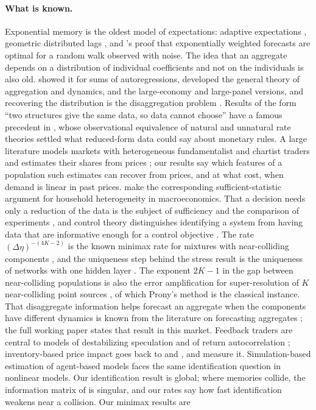 \documentclass[12pt]{article}
\theoremstyle{definition}
\theoremstyle{remark}
\begin{document}
\paragraph{What is known.} Exponential memory is the oldest model of expectations: adaptive expectations \citep{cagan1956,nerlove1958}, geometric distributed lags \citep{koyck1954}, and \citet{muth1960}'s proof that exponentially weighted forecasts are optimal for a random walk observed with noise. The idea that an aggregate depends on a distribution of individual coefficients and not on the individuals is also old. \citet{granger1980} showed it for sums of autoregressions, \citet{forni1997} developed the general theory of aggregation and dynamics, \citet{zaffaroni2004} and \citet{pesaran2014} the large-economy and large-panel versions, and recovering the distribution is the disaggregation problem \citep{celov2008}. Results of the form ``two structures give the same data, so data cannot choose'' have a famous precedent in \citet{sargent1976}, whose observational equivalence of natural and unnatural rate theories settled what reduced-form data could say about monetary rules. A large literature models markets with heterogeneous fundamentalist and chartist traders \citep{brock1998,hommes2006} and estimates their shares from prices \citep{boswijk2007,franke2012,lux2018}; our results say which features of a population such estimates can recover from prices, and at what cost, when demand is linear in past prices. \citet{auclert2024} make the corresponding sufficient-statistic argument for household heterogeneity in macroeconomics. That a decision needs only a reduction of the data is the subject of sufficiency and the comparison of experiments \citep{blackwell1953,lecam1964}, and control theory distinguishes identifying a system from having data that are informative enough for a control objective \citep{vanwaarde2020}. The rate $(\Delta\eta)^{-(4K-2)}$ is the known minimax rate for mixtures with near-colliding components \citep{heinrich2018,wu2020}, and the uniqueness step behind the stress result is the uniqueness of networks with one hidden layer \citep{sussmann1992}. The exponent $2K-1$ in the gap between near-colliding populations is also the error amplification for super-resolution of $K$ near-colliding point sources \citep{batenkov2021}, of which Prony's method is the classical instance. That disaggregate information helps forecast an aggregate when the components have different dynamics is known from the literature on forecasting aggregates \citep{lutkepohl1987,hendry2011}; the full working paper \citep{niroula2026full} states that result in this market. Feedback traders are central to models of destabilizing speculation and of return autocorrelation \citep{delong1990,cutler1990,sentana1992}; inventory-based price impact goes back to \citet{ho1981} and \citet{grossman1988}, and \citet{hendershott2014} measure it. Simulation-based estimation of agent-based models \citep{grazzini2015,platt2020} faces the same identification question in nonlinear models. Our identification result is global; where memories collide, the information matrix of \citet{rothenberg1971} is singular, and our rates say how fast identification weakens near a collision. Our minimax results are 
\end{document}

